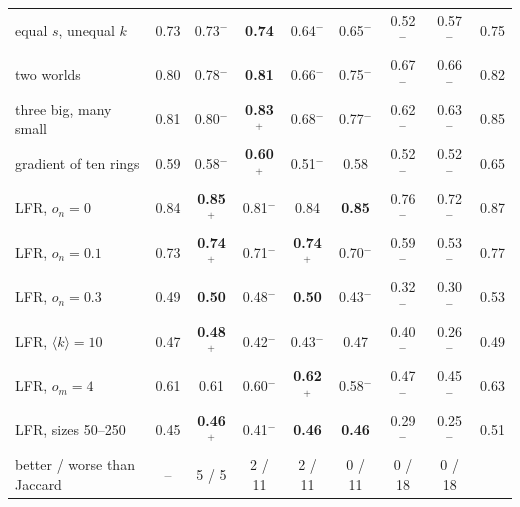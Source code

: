 \begin{table}[t]
\begin{ruledtabular}
\begin{tabular}{lccccccc|c}
equal $s$, unequal $k$ & 0.73 & 0.73$^-$ & \textbf{0.74} & 0.64$^-$ & 0.65$^-$ & 0.52$^-$ & 0.57$^-$ & 0.75 \\
two worlds & 0.80 & 0.78$^-$ & \textbf{0.81} & 0.66$^-$ & 0.75$^-$ & 0.67$^-$ & 0.66$^-$ & 0.82 \\
three big, many small & 0.81 & 0.80$^-$ & \textbf{0.83$^+$} & 0.68$^-$ & 0.77$^-$ & 0.62$^-$ & 0.63$^-$ & 0.85 \\
gradient of ten rings & 0.59 & 0.58$^-$ & \textbf{0.60$^+$} & 0.51$^-$ & 0.58 & 0.52$^-$ & 0.52$^-$ & 0.65 \\
LFR, $o_n{=}0$ & 0.84 & \textbf{0.85$^+$} & 0.81$^-$ & 0.84 & \textbf{0.85} & 0.76$^-$ & 0.72$^-$ & 0.87 \\
LFR, $o_n{=}0.1$ & 0.73 & \textbf{0.74$^+$} & 0.71$^-$ & \textbf{0.74$^+$} & 0.70$^-$ & 0.59$^-$ & 0.53$^-$ & 0.77 \\
LFR, $o_n{=}0.3$ & 0.49 & \textbf{0.50} & 0.48$^-$ & \textbf{0.50} & 0.43$^-$ & 0.32$^-$ & 0.30$^-$ & 0.53 \\
LFR, $\langle k\rangle{=}10$ & 0.47 & \textbf{0.48$^+$} & 0.42$^-$ & 0.43$^-$ & 0.47 & 0.40$^-$ & 0.26$^-$ & 0.49 \\
LFR, $o_m{=}4$ & 0.61 & 0.61 & 0.60$^-$ & \textbf{0.62$^+$} & 0.58$^-$ & 0.47$^-$ & 0.45$^-$ & 0.63 \\
LFR, sizes 50--250 & 0.45 & \textbf{0.46$^+$} & 0.41$^-$ & \textbf{0.46} & \textbf{0.46} & 0.29$^-$ & 0.25$^-$ & 0.51 \\
\hline
better / worse than Jaccard & -- & 5 / 5 & 2 / 11 & 2 / 11 & 0 / 11 & 0 / 18 & 0 / 18 & \\
\end{tabular}
\end{ruledtabular}
\end{table}

